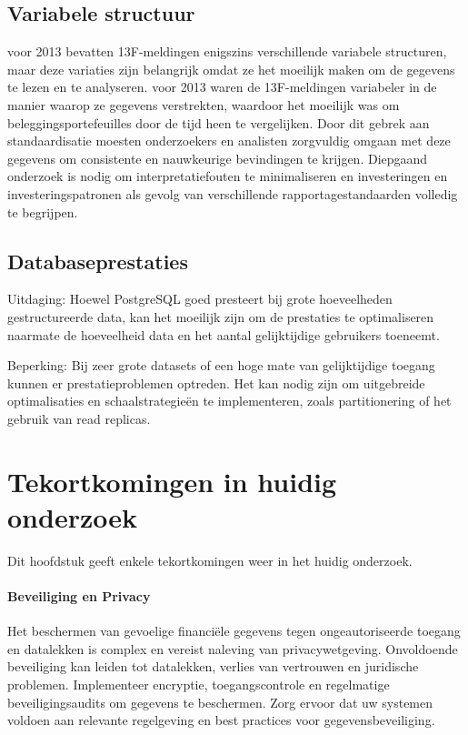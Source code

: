 \subsection{Variabele structuur}
voor 2013 bevatten 13F-meldingen enigszins verschillende variabele structuren, maar deze variaties zijn belangrijk omdat ze het moeilijk maken om de gegevens te lezen en te analyseren. voor 2013 waren de 13F-meldingen variabeler in de manier waarop ze gegevens verstrekten, waardoor het moeilijk was om beleggingsportefeuilles door de tijd heen te vergelijken. Door dit gebrek aan standaardisatie moesten onderzoekers en analisten zorgvuldig omgaan met deze gegevens om consistente en nauwkeurige bevindingen te krijgen. Diepgaand onderzoek is nodig om interpretatiefouten te minimaliseren en investeringen en investeringspatronen als gevolg van verschillende rapportagestandaarden volledig te begrijpen.



\subsection{Databaseprestaties}
Uitdaging: Hoewel PostgreSQL goed presteert bij grote hoeveelheden gestructureerde data, kan het moeilijk zijn om de prestaties te optimaliseren naarmate de hoeveelheid data en het aantal gelijktijdige gebruikers toeneemt.

Beperking: Bij zeer grote datasets of een hoge mate van gelijktijdige toegang kunnen er prestatieproblemen optreden. Het kan nodig zijn om uitgebreide optimalisaties en schaalstrategieën te implementeren, zoals partitionering of het gebruik van read replicas.
\section{Tekortkomingen in huidig onderzoek}
Dit hoofdstuk geeft enkele tekortkomingen weer in het huidig onderzoek.

\paragraph{Beveiliging en Privacy}
Het beschermen van gevoelige financiële gegevens tegen ongeautoriseerde toegang en datalekken is complex en vereist naleving van privacywetgeving. Onvoldoende beveiliging kan leiden tot datalekken, verlies van vertrouwen en juridische problemen. Implementeer encryptie, toegangscontrole en regelmatige beveiligingsaudits om gegevens te beschermen. Zorg ervoor dat uw systemen voldoen aan relevante regelgeving en best practices voor gegevensbeveiliging.

